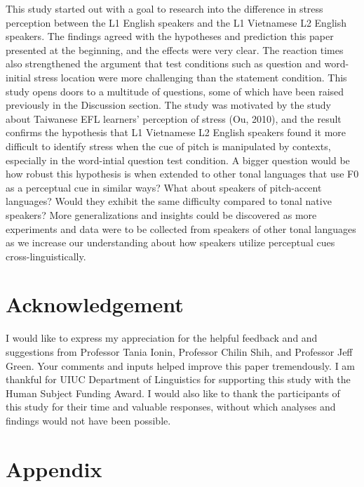 \documentclass[a4paper]{article}
\begin{document}
This study started out with a goal to research into the difference in stress perception between the L1 English speakers and the L1 Vietnamese L2 English speakers. The findings agreed with the hypotheses and prediction this paper presented at the beginning, and the effects were very clear. The reaction times also strengthened the argument that test conditions such as question and word-initial stress location were more challenging than the statement condition. This study opens doors to a multitude of questions, some of which have been raised previously in the Discussion section. The study was motivated by the study about Taiwanese EFL learners' perception of stress (Ou, 2010), and the result confirms the hypothesis that L1 Vietnamese L2 English speakers found it more difficult to identify stress when the cue of pitch is manipulated by contexts, especially in the word-intial question test condition. A bigger question would be how robust this hypothesis is when extended to other tonal languages that use F0 as a perceptual cue in similar ways? What about speakers of pitch-accent languages? Would they exhibit the same difficulty compared to tonal native speakers? More generalizations and insights could be discovered as more experiments and data were to be collected from speakers of other tonal languages as we increase our understanding about how speakers utilize perceptual cues cross-linguistically.

\section*{Acknowledgement}
I would like to express my appreciation for the helpful feedback and and suggestions from Professor Tania Ionin, Professor Chilin Shih, and Professor Jeff Green. Your comments and inputs helped improve this paper tremendously. I am thankful for UIUC Department of Linguistics for supporting this study with the Human Subject Funding Award. I would also like to thank the participants of this study for their time and valuable responses, without which analyses and findings would not have been possible.
\appendix

\section{Appendix}
\end{document}
